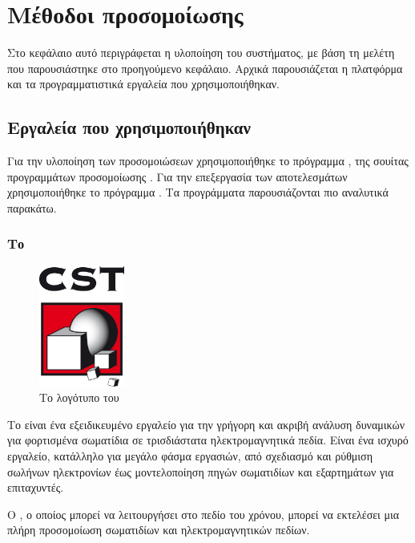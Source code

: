 \chapter{Μέθοδοι προσομοίωσης}
Στο κεφάλαιο αυτό περιγράφεται η υλοποίηση του συστήματος, με βάση τη μελέτη που παρουσιάστηκε στο προηγούμενο κεφάλαιο. 
Αρχικά παρουσιάζεται η πλατφόρμα και τα προγραμματιστικά εργαλεία που χρησιμοποιήθηκαν. 

\section{Εργαλεία που χρησιμοποιήθηκαν}
Για την υλοποίηση των προσομοιώσεων χρησιμοποιήθηκε το πρόγραμμα , της σουίτας προγραμμάτων προσομοίωσης . 
Για την επεξεργασία των αποτελεσμάτων χρησιμοποιήθηκε το πρόγραμμα . 
Τα προγράμματα παρουσιάζονται πιο αναλυτικά παρακάτω.

\subsection{Το }
\begin{figure}[tph]
\includegraphics[width=0.25\textwidth]{images/CST-logo}
\centering
\caption{Το λογότυπο του }
\label{img:CSTlogo}
\end{figure}
Το  είναι ένα εξειδικευμένο εργαλείο για την γρήγορη και ακριβή ανάλυση δυναμικών για φορτισμένα σωματίδια σε τρισδιάστατα ηλεκτρομαγνητικά πεδία.
Είναι ένα ισχυρό εργαλείο, κατάλληλο για μεγάλο φάσμα εργασιών, από σχεδιασμό  και ρύθμιση σωλήνων ηλεκτρονίων έως μοντελοποίηση πηγών σωματιδίων και εξαρτημάτων για επιταχυντές.

Ο , ο οποίος μπορεί να λειτουργήσει στο πεδίο του χρόνου, μπορεί να εκτελέσει μια πλήρη προσομοίωση σωματιδίων και ηλεκτρομαγνητικών πεδίων.

